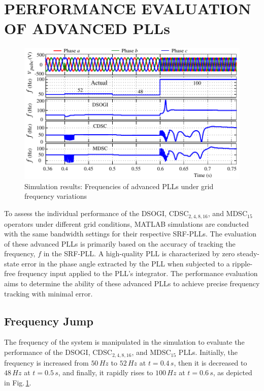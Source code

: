 \section{PERFORMANCE EVALUATION OF ADVANCED PLLs}
\begin{figure}[] 
	\centering
	\includegraphics[scale=1]{figures/Chapter_3/Mine/SimRes1_new.pdf}
	\caption{Simulation results: Frequencies of advanced PLLs under grid frequency variations}
	\label{fig3.9(1)}
\end{figure}
To assess the individual performance of the DSOGI, CDSC$_{2,4,8,16}$, and MDSC$_{15}$ operators under different grid conditions, MATLAB simulations are conducted with the same bandwidth settings for their respective SRF-PLLs. The evaluation of these advanced PLLs is primarily based on the accuracy of tracking the frequency, $f$ in the SRF-PLL. A high-quality PLL is characterized by zero steady-state error in the phase angle extracted by the PLL when subjected to a ripple-free frequency input applied to the PLL's integrator. The performance evaluation aims to determine the ability of these advanced PLLs to achieve precise frequency tracking with minimal error.
\subsection{Frequency Jump} 
The frequency of the system is manipulated in the simulation to evaluate the performance of the DSOGI, CDSC$_{2,4,8,16}$, and MDSC$_{15}$ PLLs. Initially, the frequency is increased from $50\,\si{Hz}$ to $52\,\si{Hz}$ at $t=0.4\,\si{s}$, then it is decreased to $48\,\si{Hz}$ at $t=0.5\,\si{s}$, and finally, it rapidly rises to $100\,\si{Hz}$ at $t=0.6\,\si{s}$, as depicted in Fig.\,\ref{fig3.9(1)}.

